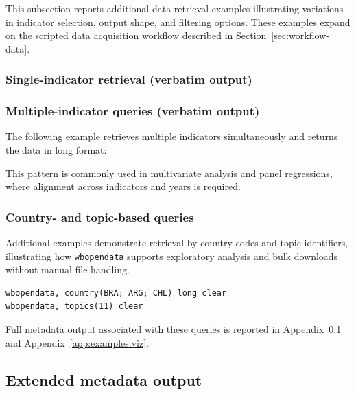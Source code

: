 \documentclass[bib]{statapress}
\begin{document}
This subsection reports additional data retrieval examples illustrating
variations in indicator selection, output shape, and filtering options. These
examples expand on the scripted data acquisition workflow described in
Section~\ref{sec:workflow-data}.

\subsubsection{Single-indicator retrieval (verbatim output)}
\begin{stlog}
\nullskip
\end{stlog}

\subsubsection{Multiple-indicator queries (verbatim output)}
The following example retrieves multiple indicators simultaneously and returns
the data in long format:
\begin{stlog}
\nullskip
\end{stlog}

This pattern is commonly used in multivariate analysis and panel regressions,
where alignment across indicators and years is required.

\subsubsection{Country- and topic-based queries}
Additional examples demonstrate retrieval by country codes and topic identifiers,
illustrating how \texttt{wbopendata} supports exploratory analysis and bulk downloads
without manual file handling.

\begin{verbatim}
wbopendata, country(BRA; ARG; CHL) long clear
wbopendata, topics(11) clear
\end{verbatim}

Full metadata output associated with these queries is reported in
Appendix~\ref{app:examples:metadata} and Appendix~\ref{app:examples:viz}.

\subsection{Extended metadata output}\label{app:examples:metadata}
\end{document}
